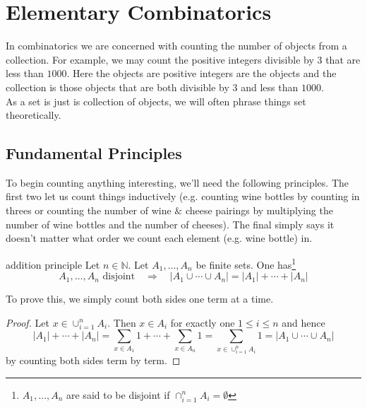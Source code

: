 \documentclass{article}
\newcounter{definitioncount} %
\newcounter{lemmacount}
\newcounter{examplecount}
\newcounter{theoremcount}
\newcounter{propositioncount}
\newcounter{corollarycount}
\newcounter{remarkcount}
\newcounter{problemcount}
\newcounter{exercisecount}
\begin{document}
\newpage

\tableofcontents

\newpage

\section{Elementary Combinatorics}

\setcounter{lemmacount}{1}
\setcounter{examplecount}{1}
\setcounter{theoremcount}{1}
\setcounter{propositioncount}{1}
\setcounter{corollarycount}{1}
\setcounter{remarkcount}{1}
\setcounter{definitioncount}{1}
\setcounter{problemcount}{1}
\setcounter{exercisecount}{1}


In combinatorics we are concerned with counting the number of objects from a collection. For example, we may count the positive integers divisible
by $3$ that are less than $1000$. Here the objects are positive integers are the objects and the collection is those objects that are both divisible 
by $3$ and less than $1000$. \\

As a set is just is collection of objects, we will often phrase things set theoretically. 

\subsection{Fundamental Principles}


To begin counting anything interesting, we'll need the following principles. The first two let us count things inductively (e.g. counting 
wine bottles by counting in threes or counting the number of wine $\&$ cheese pairings by multiplying the number of wine bottles and the 
number of cheeses). The final simply says it doesn't matter what order we count each element (e.g. wine bottle) in.  

\begin{theorem}[]{addition principle}
    Let $n \in \mathbb{N}$. Let $A_1, \dots, A_n$ be finite sets. One has\footnote{$A_1, \dots, A_n$ are said to be disjoint if 
    $\cap_{i=1}^n A_i = \emptyset$}
    \[A_1, \dots, A_n \text{ disjoint} \quad \Longrightarrow \quad |A_1 \cup \cdots \cup A_n| = |A_1| + \cdots + |A_n|\]
\end{theorem}

To prove this, we simply count both sides one term at a time.

\begin{proof}
    Let $x \in \cup_{i=1}^n A_i$. Then $x \in A_i$ for exactly one $1 \leq i \leq n$ and hence 
    \[|A_1| + \cdots + |A_n| =\sum_{x \in A_1}1 + \cdots + \sum_{x \in A_n}1 = \sum_{x \in \cup_{i=1}^n A_i}1 = |A_1 \cup \cdots \cup A_n|\] 
    by counting both sides term by term.
\end{proof}
\end{document}
